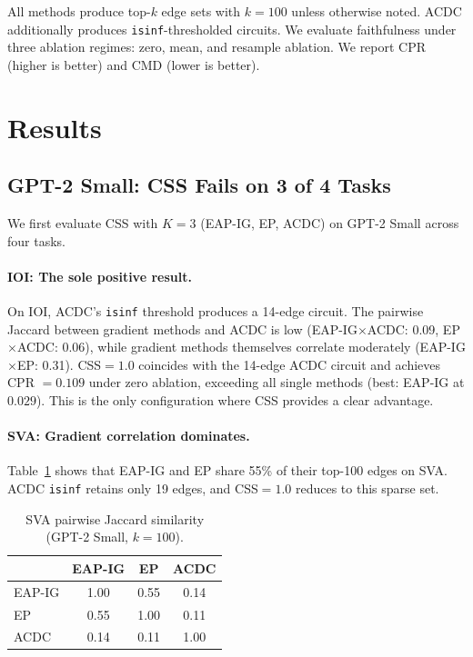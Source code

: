 \documentclass[11pt]{article}
\begin{document}
All methods produce top-$k$ edge sets with $k = 100$ unless otherwise noted. ACDC additionally produces \texttt{isinf}-thresholded circuits. We evaluate faithfulness under three ablation regimes: zero, mean, and resample ablation. We report CPR (higher is better) and CMD (lower is better).

\section{Results}

\subsection{GPT-2 Small: CSS Fails on 3 of 4 Tasks}
\label{sec:gpt2}

We first evaluate CSS with $K=3$ (EAP-IG, EP, ACDC) on GPT-2 Small across four tasks.

\paragraph{IOI: The sole positive result.} On IOI, ACDC's \texttt{isinf} threshold produces a 14-edge circuit. The pairwise Jaccard between gradient methods and ACDC is low (EAP-IG$\times$ACDC: 0.09, EP$\times$ACDC: 0.06), while gradient methods themselves correlate moderately (EAP-IG$\times$EP: 0.31). CSS$=1.0$ coincides with the 14-edge ACDC circuit and achieves CPR $= 0.109$ under zero ablation, exceeding all single methods (best: EAP-IG at $0.029$). This is the only configuration where CSS provides a clear advantage.

\paragraph{SVA: Gradient correlation dominates.} Table~\ref{tab:sva_jaccard} shows that EAP-IG and EP share 55\% of their top-100 edges on SVA. ACDC \texttt{isinf} retains only 19 edges, and CSS$=1.0$ reduces to this sparse set.

\begin{table}[h]
\centering
\caption{SVA pairwise Jaccard similarity (GPT-2 Small, $k=100$).}
\label{tab:sva_jaccard}
\begin{tabular}{lccc}
\toprule
 & EAP-IG & EP & ACDC \\
\midrule
EAP-IG & 1.00 & 0.55 & 0.14 \\
EP & 0.55 & 1.00 & 0.11 \\
ACDC & 0.14 & 0.11 & 1.00 \\
\bottomrule
\end{tabular}
\end{table}
\end{document}
